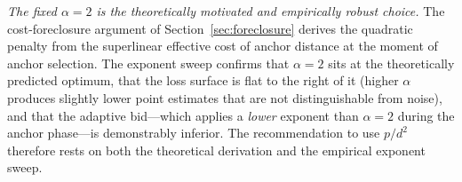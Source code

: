 \emph{The fixed $\alpha = 2$ is the theoretically motivated and empirically
robust choice.}
The cost-foreclosure argument of Section~\ref{sec:foreclosure} derives
the quadratic penalty from the superlinear effective cost of anchor
distance at the moment of anchor selection.
The exponent sweep confirms that $\alpha = 2$ sits at the theoretically
predicted optimum, that the loss surface is flat to the right of it (higher
$\alpha$ produces slightly lower point estimates that are not distinguishable
from noise), and that the adaptive bid---which applies a \emph{lower}
exponent than $\alpha = 2$ during the anchor phase---is demonstrably
inferior. The recommendation to use $p/d^2$ therefore rests on both the
theoretical derivation and the empirical exponent sweep.
